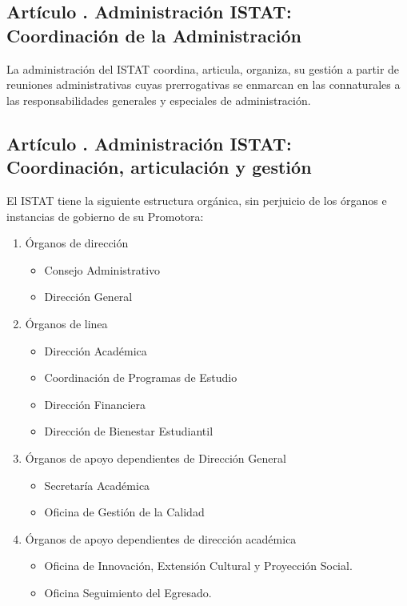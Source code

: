\subsection{Artículo . Administración ISTAT: Coordinación de la Administración}
\addtocounter{ns}{1}
La administración del ISTAT coordina, articula, organiza, su gestión a partir de reuniones administrativas cuyas prerrogativas se enmarcan en las connaturales a las responsabilidades generales y especiales de administración.  
\subsection{Artículo . Administración ISTAT: Coordinación, articulación y gestión}
\addtocounter{ns}{1}
El ISTAT tiene la siguiente estructura orgánica, sin perjuicio de los órganos e instancias de gobierno de su Promotora:  
\begin{enumerate}
\item Órganos de dirección
	\begin{itemize}
		\item Consejo Administrativo
		\item Dirección General
	\end{itemize}
\item Órganos de linea
	\begin{itemize}
		\item Dirección Académica
		\item Coordinación de Programas de Estudio
		\item Dirección Financiera
		\item Dirección de Bienestar Estudiantil
	\end{itemize}
	
\item Órganos de apoyo dependientes de Dirección General  
	\begin{itemize}
		\item Secretaría Académica
		\item Oficina de Gestión de la Calidad
	\end{itemize}
\item Órganos de apoyo dependientes de dirección académica
	\begin{itemize}
		\item Oficina de Innovación, Extensión Cultural y Proyección Social. 
		\item Oficina Seguimiento del Egresado.
	\end{itemize}
\end{enumerate}
